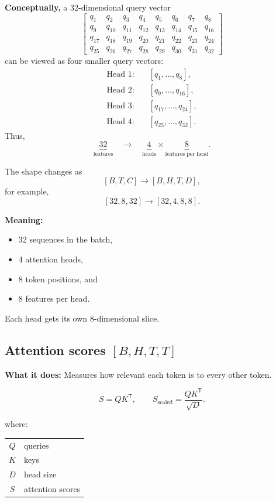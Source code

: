 \textbf{Conceptually,} a 32-dimensional query vector
\[
\left[
\begin{array}{cccccccc}
q_1 & q_2 & q_3 & q_4 & q_5 & q_6 & q_7 & q_8 \\
q_9 & q_{10} & q_{11} & q_{12} & q_{13} & q_{14} & q_{15} & q_{16} \\
q_{17} & q_{18} & q_{19} & q_{20} & q_{21} & q_{22} & q_{23} & q_{24} \\
q_{25} & q_{26} & q_{27} & q_{28} & q_{29} & q_{30} & q_{31} & q_{32}
\end{array}
\right]
\]
can be viewed as four smaller query vectors:
\begin{align*}
  \text{Head 1:}&\quad [q_1,\ldots,q_8],\\
  \text{Head 2:}&\quad [q_9,\ldots,q_{16}],\\
  \text{Head 3:}&\quad [q_{17},\ldots,q_{24}],\\
  \text{Head 4:}&\quad [q_{25},\ldots,q_{32}].
\end{align*}
Thus,
\[
  \underbrace{32}_{\text{features}}
  \quad\longrightarrow\quad
  \underbrace{4}_{\text{heads}}
  \times
  \underbrace{8}_{\text{features per head}}.
\]

The shape changes as
\[
  [B,T,C] \longrightarrow [B,H,T,D],
\]
for example,
\[
  [32,8,32] \longrightarrow [32,4,8,8].
\]


\textbf{Meaning:}
\begin{itemize}
  \setlength{\itemsep}{0pt}
  \item 32 sequences in the batch,
  \item 4 attention heads,
  \item 8 token positions, and
  \item 8 features per head.
\end{itemize}
Each head gets its own 8-dimensional slice.

\subsection{Attention scores \( [B,H,T,T] \)}

\textbf{What it does:} Measures how relevant each token is to every other
token.

\[
  S=QK^{\mathsf T},
  \qquad
  S_{\text{scaled}}=\frac{QK^{\mathsf T}}{\sqrt{D}}.
\]

where:
\begin{center}
\begin{tabular}{@{}cl@{}}
  \(Q\) & queries \\
  \(K\) & keys \\
  \(D\) & head size \\
  \(S\) & attention scores
\end{tabular}
\end{center}

